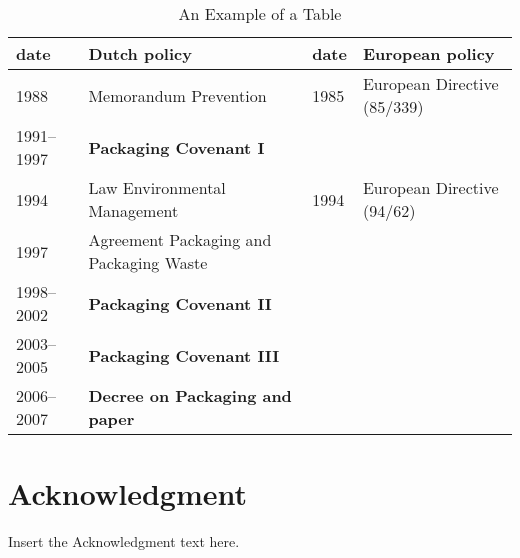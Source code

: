 \documentclass[]{rsos}%
\begin{document}
\begin{table}[!h]
\caption{An Example of a Table}%
\label{table_example}
\begin{tabular}{llll}%
\hline
date &Dutch policy &date &European policy \\
\hline
1988 &Memorandum Prevention &1985 &European Directive (85/339) \\
1991--1997 &{\bf Packaging Covenant I} & & \\
1994 &Law Environmental Management &1994 &European Directive (94/62) \\
1997 &Agreement Packaging and Packaging Waste & & \\
1998--2002 &{\bf Packaging Covenant II} & & \\
2003--2005 &{\bf Packaging Covenant III} & & \\
2006--2007 &{\bf Decree on Packaging and paper} & & \\\hline
\end{tabular}
\end{table}%


\section*{Acknowledgment}

Insert the Acknowledgment text here.






\end{document}
